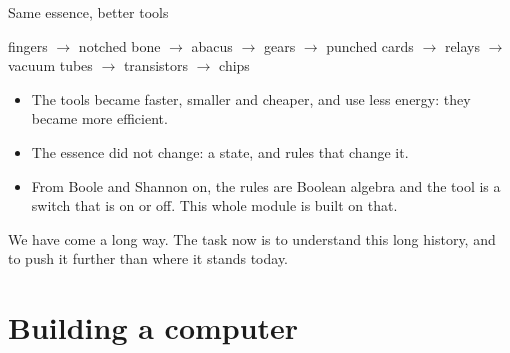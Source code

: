 \documentclass[10pt]{wosm-slides}
\begin{document}
\begin{frame}{Same essence, better tools}
  \begin{center}
    \small
    fingers $\rightarrow$ notched bone $\rightarrow$ abacus $\rightarrow$
    gears $\rightarrow$ punched cards $\rightarrow$ relays $\rightarrow$
    vacuum tubes $\rightarrow$ transistors $\rightarrow$ chips
  \end{center}

  \bigskip
  \begin{itemize}
    \item The tools became faster, smaller and cheaper, and use less energy: they
      became more \alert{efficient}.
    \item The essence did not change: a state, and rules that change it.
    \item From Boole and Shannon on, the rules are Boolean algebra and the tool is a
      switch that is on or off. This whole module is built on that.
  \end{itemize}

  \bigskip
  \begin{block}{}
    We have come a long way. The task now is to understand this long history, and
    to push it further than where it stands today.
  \end{block}
\end{frame}

\section{Building a computer}
\end{document}
